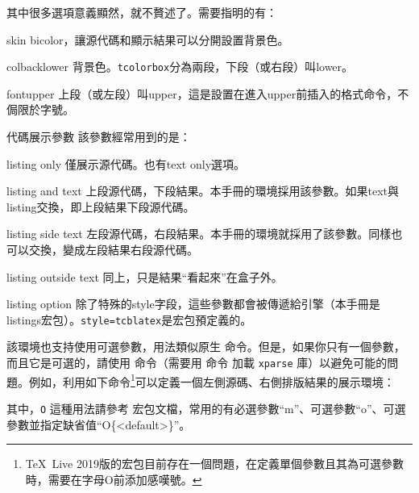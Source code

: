 其中很多選項意義顯然，就不贅述了。需要指明的有：
\begin{para}
\item[skin] bicolor，讓源代碼和顯示結果可以分開設置背景色。
\item[colbacklower] 背景色。\texttt{tcolorbox}分為兩段，下段（或右段）叫lower。
\item[fontupper] 上段（或左段）叫upper，這是設置在進入upper前插入的格式命令，不侷限於字號。
\item[代碼展示參數] 該參數經常用到的是：
    \begin{para}
      \item[listing only] 僅展示源代碼。也有text only選項。
      \item[listing and text] 上段源代碼，下段結果。本手冊的環境採用該參數。如果text與listing交換，即上段結果下段源代碼。
      \item[listing side text] 左段源代碼，右段結果。本手冊的環境就採用了該參數。同樣也可以交換，變成左段結果右段源代碼。
      \item[listing outside text] 同上，只是結果“看起來”在盒子外。
    \end{para}
\item[listing option] 除了特殊的style字段，這些參數都會被傳遞給引擎（本手冊是listings宏包）。\texttt{style=tcblatex}是宏包預定義的。
\end{para}

該環境也支持使用可選參數，用法類似原生  命令。但是，如果你只有一個參數，而且它是可選的，請使用  命令（需要用  命令 加載 \texttt{xparse} 庫）以避免可能的問題。例如，利用如下命令\footnote{\TeX\ Live 2019版的宏包目前存在一個問題，在定義單個參數且其為可選參數時，需要在字母O前添加感嘆號。}可以定義一個左側源碼、右側排版結果的展示環境：
\begin{latex}
\end{latex}
其中，\texttt{O} 這種用法請參考  宏包文檔，常用的有必選參數“m”、可選參數“o”、可選參數並指定缺省值“O\{<default>\}”。

